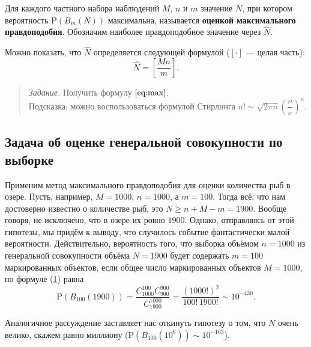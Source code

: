 \documentclass[11pt,a4paper]{article}
\begin{document}
Для каждого частного набора наблюдений \(M\), \(n\) и \(m\) значение
\(N\), при котором вероятность \(\mathrm{P}(B_m(N))\) максимальна,
называется \textbf{оценкой максимального правдоподобия}. Обозначим
наиболее правдоподобное значение через \(\hat{N}\).

Можно показать, что \(\hat{N}\) определяется следующей формулой
(\([\cdot]\) --- целая часть):
\[ \hat{N} = \left[\dfrac{Mn}{m}\right]. \tag{2}\label{eq:max} \]

\begin{quote}
\emph{Задание.} Получить формулу \(\eqref{eq:max}\).\\
Подсказка: можно воспользоваться формулой Стирлинга
\(n! \sim \sqrt{2 \pi n}\left( \dfrac{n}{e} \right)^n\).
\end{quote}

    \hypertarget{ux437ux430ux434ux430ux447ux430-ux43eux431-ux43eux446ux435ux43dux43aux435-ux433ux435ux43dux435ux440ux430ux43bux44cux43dux43eux439-ux441ux43eux432ux43eux43aux443ux43fux43dux43eux441ux442ux438-ux43fux43e-ux432ux44bux431ux43eux440ux43aux435}{%
\subsection{Задача об оценке генеральной совокупности по
выборке}\label{ux437ux430ux434ux430ux447ux430-ux43eux431-ux43eux446ux435ux43dux43aux435-ux433ux435ux43dux435ux440ux430ux43bux44cux43dux43eux439-ux441ux43eux432ux43eux43aux443ux43fux43dux43eux441ux442ux438-ux43fux43e-ux432ux44bux431ux43eux440ux43aux435}}

Применим метод максимального правдоподобия для оценки количества рыб в
озере. Пусть, например, \(M=1000\), \(n=1000\), а \(m=100\). Тогда всё,
что нам достоверно известно о количестве рыб, это
\(N \ge n + M - m = 1900\). Вообще говоря, не исключено, что в озере их
ровно \(1900\). Однако, отправляясь от этой гипотезы, мы придём к
выводу, что случилось событие фантастически малой вероятности.
Действительно, вероятность того, что выборка объёмом \(n=1000\) из
генеральной совокупности объёма \(N=1900\) будет содержать \(m=100\)
маркированных объектов, если общее число маркированных объектов
\(M=1000\), по формуле (\hyperref[mjx-eqn-eqprob]{1}) равна \[
    \mathrm{P}(B_{100}(1900)) = \frac{C_{1000}^{100} C_{900}^{900}}{C_{1900}^{1000}} = \frac{(1000!)^2}{100! \, 1900!} \sim 10^{-430}.
\]

Аналогичное рассуждение заставляет нас откинуть гипотезу о том, что
\(N\) очень велико, скажем равно миллиону
(\(\mathrm{P}(B_{100}(10^6)) \sim 10^{-163}\)).
\end{document}
